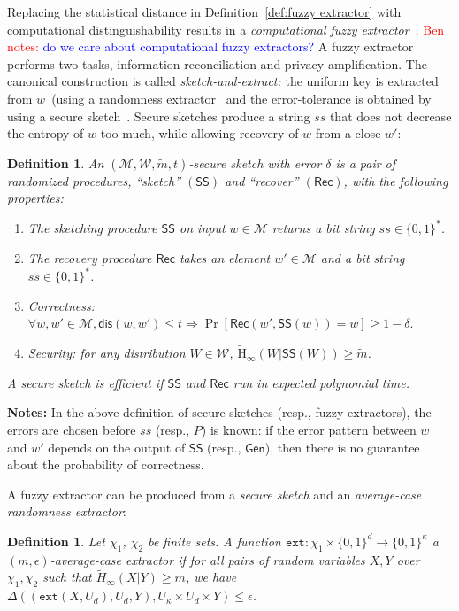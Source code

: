 \documentclass[11pt]{article}
\newcommand{\defref}[1]{\mbox{Definition~\ref{#1}}}
\newcommand{\class}[1]{{\ensuremath{\mathsf{#1}}}}
\newcommand{\gen}{\ensuremath{\class{Gen}}\xspace}
\newcommand{\sketch}{\ensuremath{\class{SS}}\xspace}
\newcommand{\rec}{\ensuremath{\class{Rec}}\xspace}
\newcommand{\dis}{\ensuremath{\mathsf{dis}}}
\newcommand{\Hav}{\tilde{\mathrm{H}}_\infty}
\newcommand{\ext}{\ensuremath{\mathtt{ext}}}
\newtheorem{definition}[theorem]{Definition}
\newcommand{\authnote}[2]{{\textcolor{red}{\textsf{#1 notes: }\textcolor{blue}{ #2}}\marginpar{\textcolor{red}{\textbf{!!!!!}}}}}
\newcommand{\authnote}[2]{}
\newcommand{\bnote}[1]{{\authnote{Ben}{#1}}}
\begin{document}
Replacing the statistical distance in \defref{def:fuzzy extractor} with computational distinguishability results in a \emph{computational fuzzy extractor}~\cite[Definition 2.5]{fuller2013computational}.  \bnote{do we care about computational fuzzy extractors?} A fuzzy extractor performs two tasks, information-reconciliation and privacy amplification.  The canonical construction is called \emph{sketch-and-extract:} the uniform key is extracted from $w$~(using a randomness extractor~\cite{nisan1993randomness} and the error-tolerance is obtained by using a secure sketch~\cite[Lemma 4.1]{DBLP:journals/siamcomp/DodisORS08}.  Secure sketches produce a string $ss$ that does not decrease the entropy of $w$ too much, while allowing recovery of $w$ from a  close $w'$:
\begin{definition}
\label{def:secure sketch}
An $(\mathcal{M},\mathcal{W}, \tilde{m}, t)$-\emph{secure sketch} with error $\delta$ is a pair of randomized procedures, ``sketch'' $(\sketch)$ and ``recover'' $(\rec)$, with the following properties:
\begin{enumerate}
\item The sketching procedure \sketch on input $w\in\mathcal{M}$ returns a bit string $ss\in\{0,1\}^*$.
\item The recovery procedure \rec takes an element $w'\in\mathcal{M}$ and a bit string $ss\in\{0,1\}^*$.  
\item \emph{Correctness}: $ \forall w, w'\in\mathcal{M}, \dis(w,w')\leq t \Rightarrow \Pr[\rec(w',\sketch(w))=w]\geq 1-\delta.$
\item \emph{Security}: for any distribution $W\in\mathcal{W}$, $\Hav(W|\sketch(W))\geq \tilde{m}$.
\end{enumerate}
A secure sketch is \emph{efficient} if \sketch and \rec run in expected polynomial time. 
\end{definition}

\textbf{Notes:} In the above definition of secure sketches (resp., fuzzy extractors), the errors are chosen before $ss$ (resp., $P$) is known: if the error pattern between $w$ and $w'$ depends on the output of $\sketch$ (resp., $\gen$), then there is no guarantee about the probability of correctness.  

A fuzzy extractor can be produced from a \emph{secure sketch} and an \emph{average-case randomness extractor}:

\begin{definition}
Let $\chi_1$, $\chi_2$ be finite sets.
A function $\ext: \chi_1\times \{0,1\}^d \rightarrow \{0,1\}^\kappa$ a \emph{$(m, \epsilon)$-average-case extractor} if for all pairs
of random variables $X, Y$ over $\chi_1, \chi_2$ such that
$\tilde{H}_\infty(X|Y) \ge m$, we have $\Delta((\ext(X, U_d), U_d, Y), U_\kappa\times
U_d \times Y) \le \epsilon$.
\end{definition}
\end{document}
